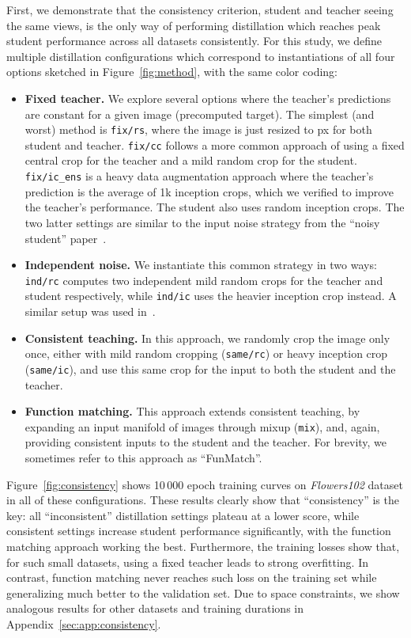 \documentclass[10pt,twocolumn,letterpaper]{article}
\begin{document}
First, we demonstrate that the consistency criterion, \ie student and teacher seeing the same views, is the only way of performing distillation which reaches peak student performance across all datasets consistently.
For this study, we define multiple distillation configurations which correspond to instantiations of all four options sketched in Figure~\ref{fig:method}, with the same color coding:
\begin{itemize}
    \item \textcolor{fixedcolor}{\bf Fixed teacher.} We explore several options where the teacher's predictions are constant for a given image (precomputed target).
    The simplest (and worst) method is {\tt fix/rs}, where the image is just resized to px for both student and teacher. {\tt fix/cc} follows a more common approach of using a fixed central crop for the teacher and a mild random crop for the student.
    {\tt fix/ic\_ens} is a heavy data augmentation approach where the teacher's prediction is the average of 1k inception crops, which we verified to improve the teacher's performance. The student also uses random inception crops. The two latter settings are similar to the input noise strategy from the ``noisy student'' paper~\cite{xie2020self}.
    \item \textcolor{indepcolor}{\bf Independent noise.} We instantiate this common strategy in two ways: {\tt ind/rc} computes two independent mild random crops for the teacher and student respectively, while {\tt ind/ic} uses the heavier inception crop instead. A similar setup was used in~\cite{tarvainen2017mean}.
    \item \textcolor{consicolor}{\bf Consistent teaching.} In this approach, we randomly crop the image only once, either with mild random cropping ({\tt same/rc}) or heavy inception crop ({\tt same/ic}), and use this same crop for the input to both the student and the teacher.
    \item \textcolor{fnmatcolor}{\bf Function matching.} This approach extends consistent teaching, by expanding an input manifold of images through mixup ({\tt mix}), and, again, providing consistent inputs to the student and the teacher. \label{par:funcmatching}
    For brevity, we sometimes refer to this approach as ``FunMatch''.
\end{itemize}

Figure~\ref{fig:consistency} shows 10\,000 epoch training curves on \emph{Flowers102} dataset in all of these configurations.
These results clearly show that ``consistency'' is the key: all ``inconsistent'' distillation settings plateau at a lower score, while consistent settings increase student performance significantly, with the function matching approach working the best.
Furthermore, the training losses show that, for such small datasets, using a fixed teacher leads to strong overfitting. In contrast, function matching never reaches such loss on the training set while generalizing much better to the validation set.
Due to space constraints, we show analogous results for other datasets and training durations in Appendix~\ref{sec:app:consistency}.
\end{document}
